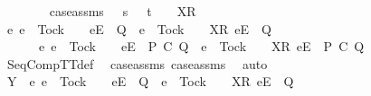 \begin{isabellebody}
\ \ \ \ \ \ \isamarkupfalse%
\ case{\isacharunderscore}assms{}{\isacharcolon}\ {\isachardoublequoteopen}{\isasymrho}\ {\isacharequal}\ s\ {\isacharat}\ {\isasymrho}{}{\isachardoublequoteclose}\ {\isachardoublequoteopen}t\ {\isacharequal}\ {\isasymrho}{}\ {\isacharat}\ {\isacharbrackleft}X{\isacharbrackright}\isactrlsub R\ {\isacharhash}\ {\isasymsigma}{\isachardoublequoteclose}\isanewline
\ \ \ \ \ \ \isamarkupfalse%
\ {\isachardoublequoteopen}{\isacharbraceleft}e{\isachardot}\ e\ {\isasymnoteq}\ Tock\ {\isasymand}\ {\isasymrho}{}\ {\isacharat}\ {\isacharbrackleft}{\isacharbrackleft}e{\isacharbrackright}\isactrlsub E{\isacharbrackright}\ {\isasymin}\ Q\ {\isasymor}\ e\ {\isacharequal}\ Tock\ {\isasymand}\ {\isasymrho}{}\ {\isacharat}\ {\isacharbrackleft}{\isacharbrackleft}X{\isacharbrackright}\isactrlsub R{\isacharcomma}\ {\isacharbrackleft}e{\isacharbrackright}\isactrlsub E{\isacharbrackright}\ {\isasymin}\ Q{\isacharbraceright}\ {\isasymsubseteq}\isanewline
\ \ \ \ \ \ {\isacharbraceleft}e{\isachardot}\ e\ {\isasymnoteq}\ Tock\ {\isasymand}\ {\isasymrho}\ {\isacharat}\ {\isacharbrackleft}{\isacharbrackleft}e{\isacharbrackright}\isactrlsub E{\isacharbrackright}\ {\isasymin}\ P\ {\isacharsemicolon}\isactrlsub C\ Q\ {\isasymor}\ e\ {\isacharequal}\ Tock\ {\isasymand}\ {\isasymrho}\ {\isacharat}\ {\isacharbrackleft}{\isacharbrackleft}X{\isacharbrackright}\isactrlsub R{\isacharcomma}\ {\isacharbrackleft}e{\isacharbrackright}\isactrlsub E{\isacharbrackright}\ {\isasymin}\ P\ {\isacharsemicolon}\isactrlsub C\ Q{\isacharbraceright}{\isachardoublequoteclose}\isanewline
\ \ \ \ \ \ \ \ \isamarkupfalse%
\ SeqCompTT{\isacharunderscore}def\ \isamarkupfalse%
\ case{\isacharunderscore}assms\ case{\isacharunderscore}assms{}\ \isamarkupfalse%
\ auto\isanewline
\ \ \ \ \ \ \isamarkupfalse%
\ \isamarkupfalse%
\ {\isachardoublequoteopen}Y\ {\isasyminter}\ {\isacharbraceleft}e{\isachardot}\ e\ {\isasymnoteq}\ Tock\ {\isasymand}\ {\isasymrho}{}\ {\isacharat}\ {\isacharbrackleft}{\isacharbrackleft}e{\isacharbrackright}\isactrlsub E{\isacharbrackright}\ {\isasymin}\ Q\ {\isasymor}\ e\ {\isacharequal}\ Tock\ {\isasymand}\ {\isasymrho}{}\ {\isacharat}\ {\isacharbrackleft}{\isacharbrackleft}X{\isacharbrackright}\isactrlsub R{\isacharcomma}\ {\isacharbrackleft}e{\isacharbrackright}\isactrlsub E{\isacharbrackright}\ {\isasymin}\ Q{\isacharbraceright}\ {\isacharequal}\ {\isacharbraceleft}{\isacharbraceright}{\isachardoublequoteclose}\isanewline

\end{isabellebody}
